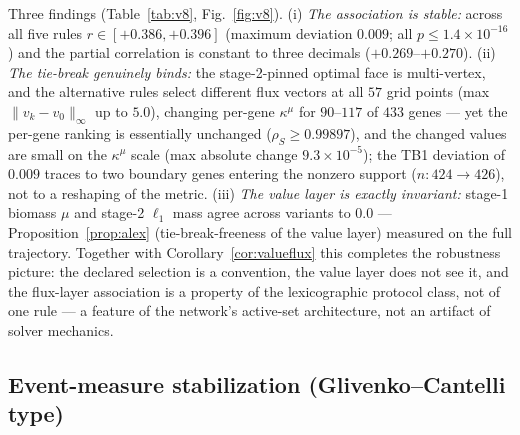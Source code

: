 \documentclass[11pt,a4paper]{article}
\theoremstyle{plain}
\theoremstyle{definition}
\theoremstyle{remark}
\newcommand{\kmu}{\kappa^{\mu}}
\begin{document}
Three findings (Table~\ref{tab:v8}, Fig.~\ref{fig:v8}). (i) \emph{The association is
stable:} across all five rules $r \in [+0.386, +0.396]$ (maximum
deviation $0.009$; all $p \le 1.4 \times 10^{-16}$) and the partial
correlation is constant to three decimals ($+0.269$--$+0.270$). (ii)
\emph{The tie-break genuinely binds:} the stage-2-pinned optimal face
is multi-vertex, and the alternative rules select different flux
vectors at all $57$ grid points (max $\|v_k - v_0\|_\infty$ up to
$5.0$), changing per-gene $\kmu$ for $90$--$117$ of $433$ genes ---
yet the per-gene ranking is essentially unchanged
($\rho_S \ge 0.99897$), and the changed values are small on the
$\kmu$ scale (max absolute change $9.3 \times 10^{-5}$); the TB1
deviation of $0.009$ traces to two boundary genes entering the
nonzero support ($n: 424 \to 426$), not to a reshaping of the metric.
(iii) \emph{The value layer is exactly invariant:} stage-1 biomass
$\mu$ and stage-2 $\ell_1$ mass agree across variants to $0.0$ ---
Proposition~\ref{prop:alex} (tie-break-freeness of the value layer)
measured on the full trajectory. Together with
Corollary~\ref{cor:valueflux} this completes the robustness picture: the
declared selection is a convention, the value layer does not see it,
and the flux-layer association is a property of the lexicographic
protocol class, not of one rule --- a feature of the network's
active-set architecture, not an artifact of solver mechanics.

\subsection{Event-measure stabilization
(Glivenko--Cantelli type)}\label{sec:e32}
\end{document}
